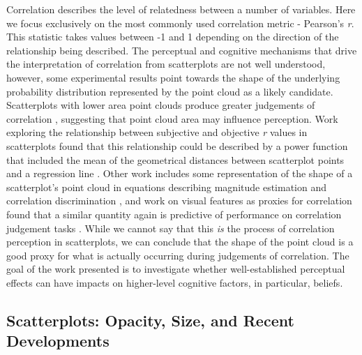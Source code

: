 \documentclass[manuscript,screen,review,anonymous]{acmart}
\begin{document}
Correlation describes the level of relatedness between a number of
variables. Here we focus exclusively on the most commonly used
correlation metric - Pearson's \emph{r}. This statistic takes values
between -1 and 1 depending on the direction of the relationship being
described. The perceptual and cognitive mechanisms that drive the
interpretation of correlation from scatterplots are not well understood,
however, some experimental results point towards the shape of the
underlying probability distribution represented by the point cloud as a
likely candidate. Scatterplots with lower area point clouds produce
greater judgements of correlation \citep{cleveland_1982}, suggesting
that point cloud area may influence perception. Work exploring the
relationship between subjective and objective \emph{r} values in
scatterplots found that this relationship could be described by a power
function that included the mean of the geometrical distances between
scatterplot points and a regression line \citep{meyer_1997}. Other work
includes some representation of the shape of a scatterplot's point cloud
in equations describing magnitude estimation and correlation
discrimination \citep{meyer_1997, rensink_2017}, and work on visual
features as proxies for correlation found that a similar quantity again
is predictive of performance on correlation judgement tasks
\citep{yang_2019}. While we cannot say that this \emph{is} the process
of correlation perception in scatterplots, we can conclude that the
shape of the point cloud is a good proxy for what is actually occurring
during judgements of correlation. The goal of the work presented is to
investigate whether well-established perceptual effects can have impacts
on higher-level cognitive factors, in particular, beliefs.

\subsection{Scatterplots: Opacity, Size, and Recent
Developments}\label{sec-scatterplots}
\end{document}
